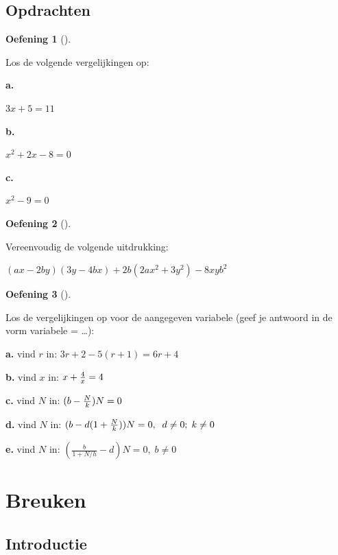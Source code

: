 \documentclass[
  a4paper,
]{scrbook}
\theoremstyle{definition}
\newtheorem{exercise}{Oefening}[chapter]
\theoremstyle{remark}
\begin{document}
\section{Opdrachten}\label{opdrachten}

\begin{exercise}[]\protect\hypertarget{exr-algebra-1}{}\label{exr-algebra-1}

Los de volgende vergelijkingen op:

\textbf{a.}

\(3x + 5 = 11\)

\textbf{b.}

\(x^2 + 2x - 8 = 0\)

\textbf{c.}

\(x^2 - 9 = 0\)

\end{exercise}

\begin{exercise}[]\protect\hypertarget{exr-algebra-2}{}\label{exr-algebra-2}

Vereenvoudig de volgende uitdrukking:

\((ax-2by)(3y-4bx)+2b(2ax^2+3y^2)-8xyb^2\)

\end{exercise}

\begin{exercise}[]\protect\hypertarget{exr-algebra-3}{}\label{exr-algebra-3}

Los de vergelijkingen op voor de aangegeven variabele (geef je antwoord
in de vorm variabele = \ldots):

\textbf{a.} vind \(r\) in: \(3r + 2 - 5(r+1) = 6r+4\)

\textbf{b.} vind \(x\) in: \(x + {4 \over x} =4\)

\textbf{c.} vind \(N\) in: \((b-{N \over k})N=0\)

\textbf{d.} vind \(N\) in:
\((b-d(1+{N \over k}))N=0,\;\;d \ne 0;\;k \ne 0\)

\textbf{e.} vind \(N\) in: \((\frac{b}{1+N/h}-d)N=0, \;b \ne 0\)

\end{exercise}

\chapter{Breuken}\label{sec-breuken}

\section{Introductie}\label{introductie-1}
\end{document}
